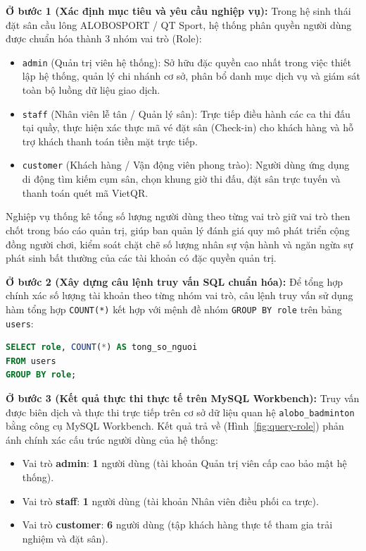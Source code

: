 \textbf{Ở bước 1 (Xác định mục tiêu và yêu cầu nghiệp vụ):} Trong hệ sinh thái đặt sân cầu lông ALOBOSPORT / QT Sport, hệ thống phân quyền người dùng được chuẩn hóa thành 3 nhóm vai trò (Role):
\begin{itemize}
    \item \texttt{admin} (Quản trị viên hệ thống): Sở hữu đặc quyền cao nhất trong việc thiết lập hệ thống, quản lý chi nhánh cơ sở, phân bổ danh mục dịch vụ và giám sát toàn bộ luồng dữ liệu giao dịch.
    \item \texttt{staff} (Nhân viên lễ tân / Quản lý sân): Trực tiếp điều hành các ca thi đấu tại quầy, thực hiện xác thực mã vé đặt sân (Check-in) cho khách hàng và hỗ trợ khách thanh toán tiền mặt trực tiếp.
    \item \texttt{customer} (Khách hàng / Vận động viên phong trào): Người dùng ứng dụng di động tìm kiếm cụm sân, chọn khung giờ thi đấu, đặt sân trực tuyến và thanh toán quét mã VietQR.
\end{itemize}
Nghiệp vụ thống kê tổng số lượng người dùng theo từng vai trò giữ vai trò then chốt trong báo cáo quản trị, giúp ban quản lý đánh giá quy mô phát triển cộng đồng người chơi, kiểm soát chặt chẽ số lượng nhân sự vận hành và ngăn ngừa sự phát sinh bất thường của các tài khoản có đặc quyền quản trị.

\textbf{Ở bước 2 (Xây dựng câu lệnh truy vấn SQL chuẩn hóa):} Để tổng hợp chính xác số lượng tài khoản theo từng nhóm vai trò, câu lệnh truy vấn sử dụng hàm tổng hợp \texttt{COUNT(*)} kết hợp với mệnh đề nhóm \texttt{GROUP BY role} trên bảng \texttt{users}:

\begin{lstlisting}[language=SQL, caption={Câu lệnh SQL thống kê tổng số lượng người dùng theo từng vai trò}]
SELECT role, COUNT(*) AS tong_so_nguoi
FROM users
GROUP BY role;
\end{lstlisting}

\textbf{Ở bước 3 (Kết quả thực thi thực tế trên MySQL Workbench):} Truy vấn được biên dịch và thực thi trực tiếp trên cơ sở dữ liệu quan hệ \texttt{alobo\_badminton} bằng công cụ MySQL Workbench. Kết quả trả về (Hình~\ref{fig:query-role}) phản ánh chính xác cấu trúc người dùng của hệ thống:
\begin{itemize}
    \item Vai trò \textbf{admin}: \textbf{1} người dùng (tài khoản Quản trị viên cấp cao bảo mật hệ thống).
    \item Vai trò \textbf{staff}: \textbf{1} người dùng (tài khoản Nhân viên điều phối ca trực).
    \item Vai trò \textbf{customer}: \textbf{6} người dùng (tập khách hàng thực tế tham gia trải nghiệm và đặt sân).
\end{itemize}


